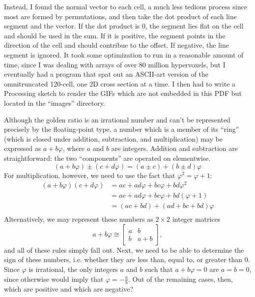 \documentclass{article}
\begin{document}
Instead, I found the normal vector to each cell,
a much less tedious process since most are formed by permutations,
and then take the dot product of each line segment and the vector.
If the dot product is 0, the segment lies flat on the cell and should be used in the sum.
If it is positive, the segment points in the direction of the cell
and should contribue to the offset.
If negative, the line segment is ignored.
It took some optimization to run in a reasonable amount of time,
since I was dealing with arrays of over 80 million hypervoxels,
but I eventually had a program that spat out an ASCII-art version of the omnitruncated 120-cell,
one 2D cross section at a time.
I then had to write a Processing sketch to render the GIFs which are not embedded in this PDF
but located in the ``images'' directory.

Although the golden ratio is an irrational number
and can't be represented precisely by the floating-point type,
a number which is a member of its ``ring''
(which is closed under addition, subtraction, and multiplication)
may be expressed as $a+b\varphi$,
where $a$ and $b$ are integers.
Addition and subtraction are straightforward:
the two ``components'' are operated on elementwise.
\[
(a+b\varphi) \pm (c+d\varphi)=(a \pm c)+(b \pm d)\varphi
\]
For multiplication, however,
we need to use the fact that $\varphi^2=\varphi+1$:
\begin{align*}
  (a+b\varphi)(c+d\varphi) &= ac+ad\varphi+bc\varphi+bd\varphi^2 \\
  &= ac+ad\varphi+bc\varphi+bd(\varphi+1) \\
  &= (ac+bd)+(ad+bc+bd)\varphi \\
\end{align*}
Alternatively, we may represent these numbers
as $2 \times 2$ integer matrices
\[
a+b\varphi \cong
\begin{bmatrix}
  a & b \\
  b & a+b
\end{bmatrix},
\]
and all of these rules simply fall out.
Next, we need to be able to determine the sign of these numbers,
i.e. whether they are less than, equal to, or greater than 0.
Since $\varphi$ is irrational,
the only integers $a$ and $b$ such that $a+b\varphi=0$
are $a=b=0$,
since otherwise would imply that $\varphi=-\frac{a}{b}$.
Out of the remaining cases, then, which are positive and which are negative?
\end{document}
